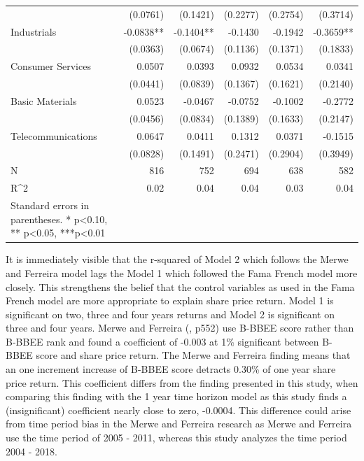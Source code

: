 \begin{table}[H]
{\begin{tabular}{lrrrrr}
                   & (0.0761)  & (0.1421)  & (0.2277)  & (0.2754)  & (0.3714)   \\
Industrials        & -0.0838** & -0.1404** & -0.1430   & -0.1942   & -0.3659**  \\
                   & (0.0363)  & (0.0674)  & (0.1136)  & (0.1371)  & (0.1833)   \\
Consumer Services  & 0.0507    & 0.0393    & 0.0932    & 0.0534    & 0.0341     \\
                   & (0.0441)  & (0.0839)  & (0.1367)  & (0.1621)  & (0.2140)   \\
Basic Materials    & 0.0523    & -0.0467   & -0.0752   & -0.1002   & -0.2772    \\
                   & (0.0456)  & (0.0834)  & (0.1389)  & (0.1633)  & (0.2147)   \\
Telecommunications & 0.0647    & 0.0411    & 0.1312    & 0.0371    & -0.1515    \\
                   & (0.0828)  & (0.1491)  & (0.2471)  & (0.2904)  & (0.3949)   \\
N                  & 816       & 752       & 694       & 638       & 582        \\
R^2                 & 0.02      & 0.04      & 0.04      & 0.03      & 0.04       \\
   \bottomrule
Standard errors in parentheses.
* p<0.10, ** p<0.05, ***p<0.01
\end{tabular}}
\end{table} 
It is immediately visible that the r-squared of Model 2 which follows the Merwe and Ferreira model lags the Model 1 which followed the Fama French model more closely. This strengthens the belief that the control variables as used in the Fama French model are more appropriate to explain share price return. Model 1 is significant on two, three and four years returns and Model 2  is significant on three and four years. Merwe and Ferreira (\citeyear{N7}, p552) use B-BBEE score rather than B-BBEE rank and found a coefficient of -0.003 at 1\% significant between B-BBEE score and share price return. The Merwe and Ferreira finding means that an one increment increase of B-BBEE score detracts 0.30\% of one year share price return. This coefficient differs from the finding presented in this study, when comparing this finding with the 1 year time horizon model as this study finds a (insignificant) coefficient nearly close to zero, -0.0004. This difference could arise from time period bias in the Merwe and Ferreira research as Merwe and Ferreira use the time period of 2005 - 2011, whereas this study analyzes the time period 2004 - 2018.

